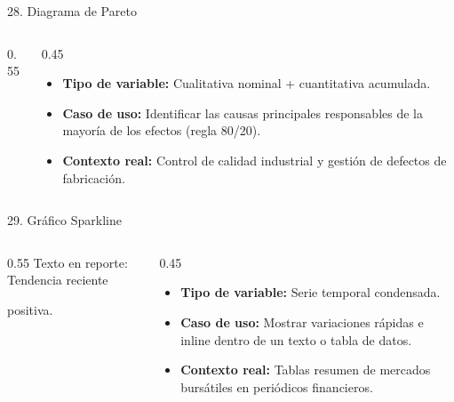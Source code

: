 \documentclass[aspectratio=169,10pt]{beamer}
\begin{document}
\begin{frame}{28. Diagrama de Pareto}
\begin{columns}
\begin{column}{0.55\textwidth}
\end{column}
\begin{column}{0.45\textwidth}
\begin{itemize}\small
\item \textbf{Tipo de variable:} Cualitativa nominal + cuantitativa acumulada.
\item \textbf{Caso de uso:} Identificar las causas principales responsables de la mayoría de los efectos (regla 80/20).
\item \textbf{Contexto real:} Control de calidad industrial y gestión de defectos de fabricación.
\end{itemize}
\end{column}
\end{columns}
\end{frame}

\begin{frame}{29. Gráfico Sparkline}
\begin{columns}
\begin{column}{0.55\textwidth}
\vspace{1cm}
Texto en reporte: Tendencia reciente  positiva.
\end{column}
\begin{column}{0.45\textwidth}
\begin{itemize}\small
\item \textbf{Tipo de variable:} Serie temporal condensada.
\item \textbf{Caso de uso:} Mostrar variaciones rápidas e inline dentro de un texto o tabla de datos.
\item \textbf{Contexto real:} Tablas resumen de mercados bursátiles en periódicos financieros.
\end{itemize}
\end{column}
\end{columns}
\end{frame}
\end{document}
